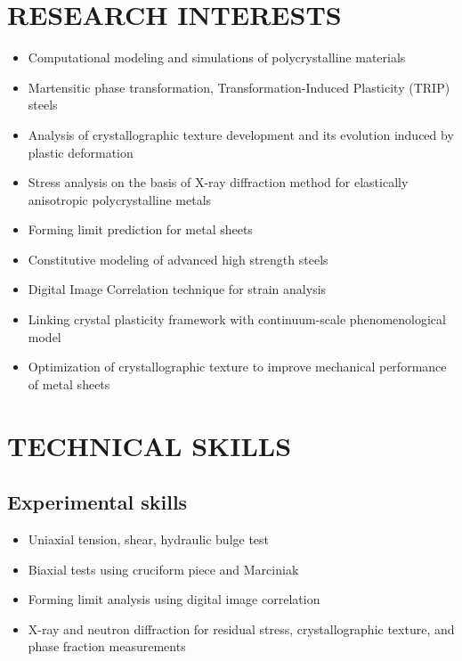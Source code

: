 \documentclass{res}
\begin{document}
\begin{resume}
  \section{RESEARCH INTERESTS}
  \begin{itemize}
  \item Computational modeling and simulations of polycrystalline materials
  \item Martensitic phase transformation, Transformation-Induced Plasticity (TRIP) steels
  \item Analysis of crystallographic texture development and its evolution induced by plastic deformation
  \item Stress analysis on the basis of X-ray diffraction method for elastically anisotropic polycrystalline metals
  \item Forming limit prediction for metal sheets
  \item Constitutive modeling of advanced high strength steels
  \item Digital Image Correlation technique for strain analysis
  \item Linking crystal plasticity framework with continuum-scale phenomenological model
  \item Optimization of crystallographic texture to improve mechanical performance of metal sheets
  \end{itemize}

  \section{TECHNICAL SKILLS}
  \subsection{Experimental skills}
  \begin{itemize}
  \item Uniaxial tension, shear, hydraulic bulge test
  \item Biaxial tests using cruciform piece and Marciniak
  \item Forming limit analysis using digital image correlation
  \item X-ray and neutron diffraction for residual stress, crystallographic texture, and phase fraction measurements
  \end{itemize}


\end{resume}
\end{document}
